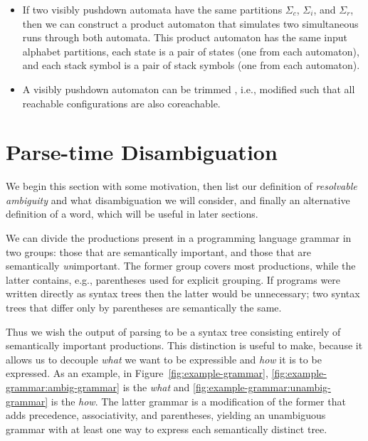 \documentclass[sigplan]{acmart}\settopmatter{printfolios=true,printccs=false,printacmref=false}
\begin{document}
\begin{itemize}
\item If two visibly pushdown automata have the same partitions $\Sigma_c$, $\Sigma_i$, and $\Sigma_r$, then we can construct a product automaton that simulates two simultaneous runs through both automata. This product automaton has the same input alphabet partitions, each state is a pair of states (one from each automaton), and each stack symbol is a pair of stack symbols (one from each automaton).
\item A visibly pushdown automaton can be trimmed \cite{caralpTrimmingVisiblyPushdown2013}, i.e., modified such that all reachable configurations are also coreachable.
\end{itemize}

\section{Parse-time Disambiguation}

We begin this section with some motivation, then list our definition of \emph{resolvable ambiguity} and what disambiguation we will consider, and finally an alternative definition of a word, which will be useful in later sections.

We can divide the productions present in a programming language grammar in two groups: those that are semantically important, and those that are semantically \emph{un}important. The former group covers most productions, while the latter contains, e.g., parentheses used for explicit grouping. If programs were written directly as syntax trees then the latter would be unnecessary; two syntax trees that differ only by parentheses are semantically the same.

Thus we wish the output of parsing to be a syntax tree consisting entirely of semantically important productions. This distinction is useful to make, because it allows us to decouple \emph{what} we want to be expressible and \emph{how} it is to be expressed. As an example, in Figure~\ref{fig:example-grammar}, \ref{fig:example-grammar:ambig-grammar} is the \emph{what} and \ref{fig:example-grammar:unambig-grammar} is the \emph{how}. The latter grammar is a modification of the former that adds precedence, associativity, and parentheses, yielding an unambiguous grammar with at least one way to express each semantically distinct tree.
\end{document}
